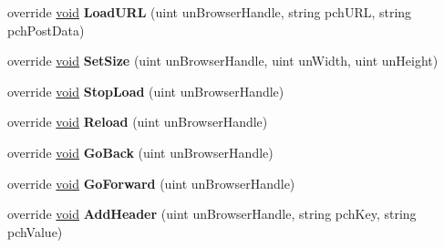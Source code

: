 \begin{DoxyCompactItemize}
\item 
\hypertarget{classValve_1_1Steamworks_1_1CSteamHTMLSurface_a6070ac30784309897ba86736a08a58b7}{}override \hyperlink{SDL__audio_8h_a52835ae37c4bb905b903cbaf5d04b05f}{void} {\bfseries Load\+U\+R\+L} (uint un\+Browser\+Handle, string pch\+U\+R\+L, string pch\+Post\+Data)\label{classValve_1_1Steamworks_1_1CSteamHTMLSurface_a6070ac30784309897ba86736a08a58b7}

\item 
\hypertarget{classValve_1_1Steamworks_1_1CSteamHTMLSurface_a750030be9fdd3ffdadfdd51f9efb54da}{}override \hyperlink{SDL__audio_8h_a52835ae37c4bb905b903cbaf5d04b05f}{void} {\bfseries Set\+Size} (uint un\+Browser\+Handle, uint un\+Width, uint un\+Height)\label{classValve_1_1Steamworks_1_1CSteamHTMLSurface_a750030be9fdd3ffdadfdd51f9efb54da}

\item 
\hypertarget{classValve_1_1Steamworks_1_1CSteamHTMLSurface_a28e2039996d684eaffda9bb5934bef85}{}override \hyperlink{SDL__audio_8h_a52835ae37c4bb905b903cbaf5d04b05f}{void} {\bfseries Stop\+Load} (uint un\+Browser\+Handle)\label{classValve_1_1Steamworks_1_1CSteamHTMLSurface_a28e2039996d684eaffda9bb5934bef85}

\item 
\hypertarget{classValve_1_1Steamworks_1_1CSteamHTMLSurface_a0e248c3818c7c2715fef5905ce41a304}{}override \hyperlink{SDL__audio_8h_a52835ae37c4bb905b903cbaf5d04b05f}{void} {\bfseries Reload} (uint un\+Browser\+Handle)\label{classValve_1_1Steamworks_1_1CSteamHTMLSurface_a0e248c3818c7c2715fef5905ce41a304}

\item 
\hypertarget{classValve_1_1Steamworks_1_1CSteamHTMLSurface_abfd528ae8f29d5da13cca30bea690787}{}override \hyperlink{SDL__audio_8h_a52835ae37c4bb905b903cbaf5d04b05f}{void} {\bfseries Go\+Back} (uint un\+Browser\+Handle)\label{classValve_1_1Steamworks_1_1CSteamHTMLSurface_abfd528ae8f29d5da13cca30bea690787}

\item 
\hypertarget{classValve_1_1Steamworks_1_1CSteamHTMLSurface_a7f64dbba0bd52be09041589faa0e8ae7}{}override \hyperlink{SDL__audio_8h_a52835ae37c4bb905b903cbaf5d04b05f}{void} {\bfseries Go\+Forward} (uint un\+Browser\+Handle)\label{classValve_1_1Steamworks_1_1CSteamHTMLSurface_a7f64dbba0bd52be09041589faa0e8ae7}

\item 
\hypertarget{classValve_1_1Steamworks_1_1CSteamHTMLSurface_a49eedcafac0d57f1c809fcc924c21828}{}override \hyperlink{SDL__audio_8h_a52835ae37c4bb905b903cbaf5d04b05f}{void} {\bfseries Add\+Header} (uint un\+Browser\+Handle, string pch\+Key, string pch\+Value)\label{classValve_1_1Steamworks_1_1CSteamHTMLSurface_a49eedcafac0d57f1c809fcc924c21828}


\end{DoxyCompactItemize}
